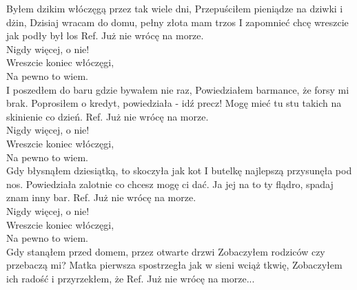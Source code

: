
\hops
Byłem dzikim włóczęgą przez tak wiele dni, \tab{} \newline
Przepuściłem  pieniądze na dziwki i dżin, \tab{} \newline
Dzisiaj wracam do domu, pełny złota mam trzos \newline
I zapomnieć chcę wreszcie jak podły był los \tab{} \newline
\hops
Ref. Już nie wrócę na morze. \tab{} \\
 Nigdy więcej, o nie!\tab{}  \\
 Wreszcie koniec włóczęgi,\tab{} \\
 Na pewno to wiem. \tab{}  \\
\hops
I poszedłem do baru gdzie bywałem nie raz, \newline
Powiedziałem barmance, że forsy mi brak. \newline
Poprosiłem o kredyt, powiedziała - idź precz! \newline
Mogę mieć tu stu  takich na skinienie co dzień. \newline
\hops
Ref. Już nie wrócę na morze.\\
 Nigdy więcej, o nie! \\
 Wreszcie koniec włóczęgi,\\
 Na pewno to wiem.\\
\hops
Gdy błysnąłem dziesiątką, to skoczyła jak kot \newline
I butelkę najlepszą przysunęła pod nos.  \newline
Powiedziała zalotnie co chcesz mogę ci dać. \newline
Ja jej na to ty flądro, spadaj znam inny bar. \newline
\hops
Ref. Już nie wrócę na morze.\\
 Nigdy więcej, o nie! \\
 Wreszcie koniec włóczęgi,\\
 Na pewno to wiem.\\
\hops
Gdy stanąłem przed domem, przez otwarte drzwi \newline
Zobaczyłem rodziców czy przebaczą mi? \newline
Matka pierwsza spostrzegła jak w sieni wciąż tkwię, \newline
Zobaczyłem ich radość i przyrzekłem, że \newline
\hops
Ref. Już nie wrócę na morze...